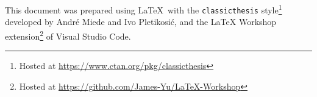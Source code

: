\documentclass[../thesis.tex]{subfiles}
\begin{document}
This document was prepared using \LaTeX\ with the \texttt{classicthesis}
style\footnote{Hosted at \url{https://www.ctan.org/pkg/classicthesis}} developed by
Andr\'e Miede and Ivo Pletikosić, and the LaTeX Workshop extension\footnote{Hosted at
\url{https://github.com/James-Yu/LaTeX-Workshop}} of Visual Studio Code.
\end{document}
